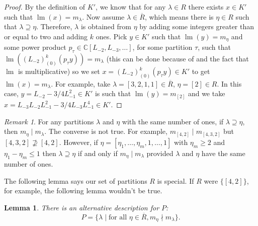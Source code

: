 \documentclass[a4paper, 12pt, reqno]{amsart}
\newtheorem{lemma}[theorem]{Lemma}
\theoremstyle{remark}
\newtheorem{remark}[theorem]{Remark}
\DeclareMathOperator{\lm}{lm}
\begin{document}
\begin{proof}
  By the definition of $K'$, we know that for any $\lambda \in R$ there exists $x \in K'$ such that $\lm(x) = m_\lambda$.
  Now assume $\lambda \in \overline{R}$, which means there is $\eta \in R$ such that $\lambda \supseteq \eta$.
  Therefore, $\lambda$ is obtained from $\eta$ by adding some integers greater than or equal to two and adding $k$ ones.
  Pick $y \in K'$ such that $\lm(y) = m_\eta$ and some power product $p_\tau \in \mathbb{C}[L_{-2}, L_{-3}, \dots]$, for some partition $\tau$, such that $\lm((L_{-2})^k_{(0)}(p_\tau y)) = m_\lambda$ (this can be done because of  and the fact that $\lm$ is multiplicative) so we set $x = (L_{-2})^k_{(0)}(p_\tau y) \in K'$ to get $\lm(x) = m_\lambda$.
  For example, take $\lambda = [3, 2, 1, 1] \in \overline{R}$, $\eta = [2] \in R$.
  In this case, $y = L_{-2}- 3/4L_{-1}^2 \in K'$ is such that $\lm(y) = m_{[2]}$ and we take $x = L_{-3}L_{-2}L_{-1}^2 - 3/4L_{-3}L_{-1}^4 \in K'$.
\end{proof}

\begin{remark}
  \label{rmk:8}
  For any partitions $\lambda$ and $\eta$ with the same number of ones, if $\lambda \supseteq \eta$, then $m_\eta \mid m_\lambda$.
  The converse is not true.
  For example, $m_{[4, 2]} \mid m_{[4, 3, 2]}$ but $[4, 3, 2] \nsupseteq [4, 2]$.
  However, if $\eta = [\eta_1, \dots, \eta_m, 1, \dots, 1]$ with $\eta_m \ge 2$ and $\eta_1 - \eta_m \le 1$ then $\lambda \supseteq \eta$ if and only if $m_\eta \mid m_\lambda$ provided $\lambda$ and $\eta$ have the same number of ones.
\end{remark}

The following lemma says our set of partitions $R$ is special.
If $R$ were $\{[4, 2]\}$, for example, the following lemma wouldn't be true.

\begin{lemma}
  \label{lmm:11}
  There is an alternative description for $P$:
  \begin{equation*}
    P = \{\lambda \mid \text{for all }\eta \in \overline{R}, m_\eta \nmid m_\lambda\}.
  \end{equation*}
\end{lemma}
\end{document}
